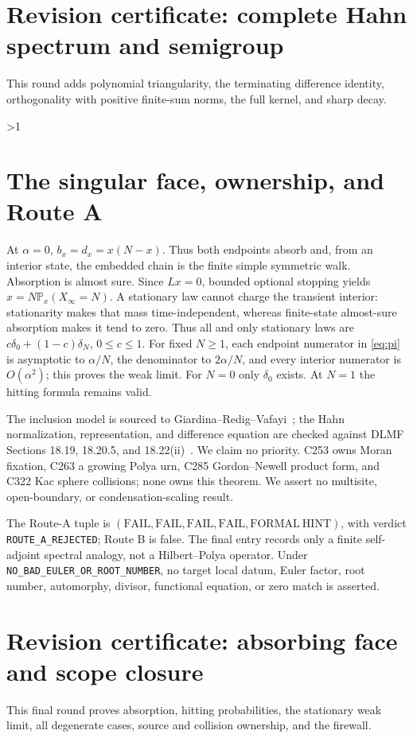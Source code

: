 \documentclass[10pt]{article}
\newcommand{\Prob}{\mathbb P}
\begin{document}
\section*{Revision certificate: complete Hahn spectrum and semigroup}
This round adds polynomial triangularity, the terminating difference identity,
orthogonality with positive finite-sum norms, the full kernel, and sharp decay.
\fi

\ifnum\CRevisionRound>1
\section{The singular face, ownership, and Route A}
At $\alpha=0$, $b_x=d_x=x(N-x)$. Thus both endpoints absorb and, from an
interior state, the embedded chain is the finite simple symmetric walk.
Absorption is almost sure. Since $Lx=0$, bounded optional stopping yields
$x=N\Prob_x(X_\infty=N)$. A stationary law cannot charge the transient
interior: stationarity makes that mass time-independent, whereas finite-state
almost-sure absorption makes it tend to zero. Thus all and only stationary
laws are $c\delta_0+(1-c)\delta_N$, $0\leq c\leq1$. For fixed $N\geq1$, each endpoint numerator in
\eqref{eq:pi} is asymptotic to $\alpha/N$, the denominator to $2\alpha/N$,
and every interior numerator is $O(\alpha^2)$; this proves the weak limit.
For $N=0$ only $\delta_0$ exists. At $N=1$ the hitting formula remains valid.

The inclusion model is sourced to Giardina--Redig--Vafayi~\cite{grv}; the Hahn
normalization, representation, and difference equation are checked against
DLMF Sections 18.19, 18.20.5, and 18.22(ii)~\cite{dlmf}. We claim no priority. C253
owns Moran fixation, C263 a growing Polya urn, C285 Gordon--Newell product form,
and C322 Kac sphere collisions; none owns this theorem. We assert no multisite,
open-boundary, or condensation-scaling result.

The Route-A tuple is $(\mathrm{FAIL},\mathrm{FAIL},\mathrm{FAIL},
\mathrm{FAIL},\mathrm{FORMAL\ HINT})$, with verdict
\texttt{ROUTE\_A\_REJECTED}; Route B is false. The final entry records only a
finite self-adjoint spectral analogy, not a Hilbert--Polya operator. Under
\texttt{NO\_BAD\_EULER\_\allowbreak OR\_ROOT\_NUMBER}, no target local datum, Euler factor,
root number, automorphy, divisor, functional equation, or zero match is asserted.

\section*{Revision certificate: absorbing face and scope closure}
This final round proves absorption, hitting probabilities, the stationary weak
limit, all degenerate cases, source and collision ownership, and the firewall.
\fi
\end{document}
